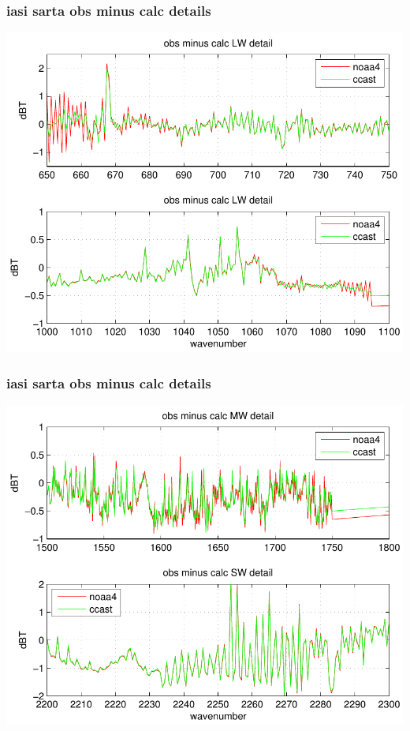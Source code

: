 \documentclass[11pt]{beamer}
\begin{document}
\begin{frame}
\frametitle{iasi sarta obs minus calc details}
\begin{center}
  \includegraphics[scale=0.7]{figures/iasi_sarta_2.pdf}
\end{center}
\end{frame}
\begin{frame}
\frametitle{iasi sarta obs minus calc details}
\begin{center}
  \includegraphics[scale=0.7]{figures/iasi_sarta_3.pdf}
\end{center}
\end{frame}
\end{document}
